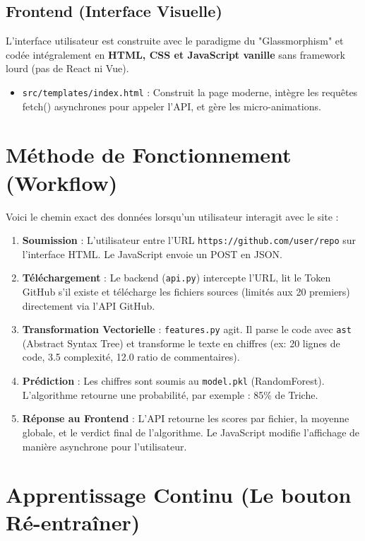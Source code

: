 \documentclass[a4paper,11pt]{article}
\begin{document}
\subsection{Frontend (Interface Visuelle)}
L'interface utilisateur est construite avec le paradigme du "Glassmorphism" et codée intégralement en \textbf{HTML, CSS et JavaScript vanille} sans framework lourd (pas de React ni Vue).
\begin{itemize}
    \item \texttt{src/templates/index.html} : Construit la page moderne, intègre les requêtes fetch() asynchrones pour appeler l'API, et gère les micro-animations.
\end{itemize}


\section{Méthode de Fonctionnement (Workflow)}

Voici le chemin exact des données lorsqu'un utilisateur interagit avec le site :

\begin{enumerate}
    \item \textbf{Soumission} : L'utilisateur entre l'URL \texttt{https://github.com/user/repo} sur l'interface HTML. Le JavaScript envoie un POST en JSON.
    \item \textbf{Téléchargement} : Le backend (\texttt{api.py}) intercepte l'URL, lit le Token GitHub s'il existe et télécharge les fichiers sources (limités aux 20 premiers) directement via l'API GitHub.
    \item \textbf{Transformation Vectorielle} : \texttt{features.py} agit. Il parse le code avec \texttt{ast} (Abstract Syntax Tree) et transforme le texte en chiffres (ex: 20 lignes de code, 3.5 complexité, 12.0 ratio de commentaires).
    \item \textbf{Prédiction} : Les chiffres sont soumis au \texttt{model.pkl} (RandomForest). L'algorithme retourne une probabilité, par exemple : 85\% de Triche.
    \item \textbf{Réponse au Frontend} : L'API retourne les scores par fichier, la moyenne globale, et le verdict final de l'algorithme. Le JavaScript modifie l'affichage de manière asynchrone pour l'utilisateur.
\end{enumerate}


\section{Apprentissage Continu (Le bouton Ré-entraîner)}
\end{document}
